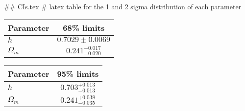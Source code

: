 ## CIs.tex
# latex table for the 1 and 2 sigma distribution of each parameter

\begin{tabular} { l  c}
 Parameter &  68\% limits\\
\hline
{\boldmath$h              $} & $0.7029\pm 0.0069          $\\
{\boldmath$\Omega_m       $} & $0.241^{+0.017}_{-0.020}   $\\
\hline
\end{tabular}

\begin{tabular} { l  c}
 Parameter &  95\% limits\\
\hline
{\boldmath$h              $} & $0.703^{+0.013}_{-0.013}   $\\
{\boldmath$\Omega_m       $} & $0.241^{+0.038}_{-0.035}   $\\
\hline
\end{tabular}

